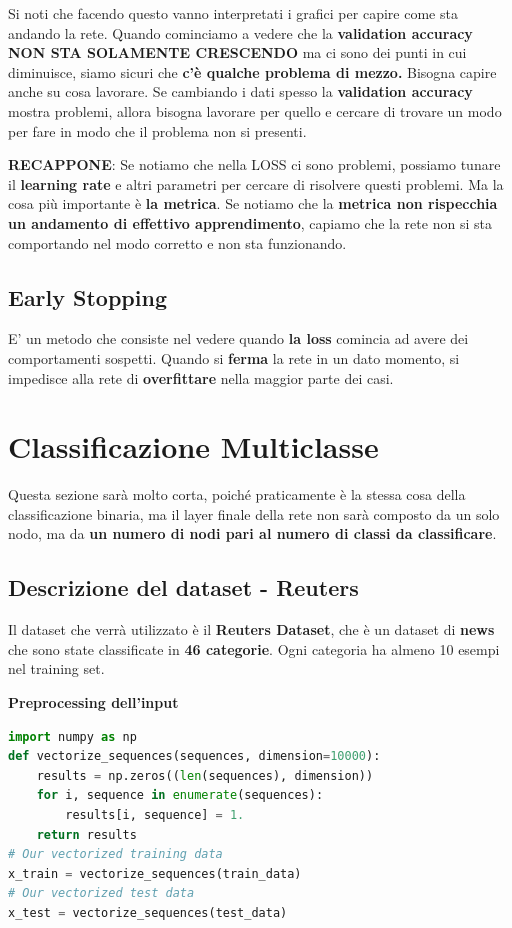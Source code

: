 Si noti che facendo questo vanno interpretati i grafici per capire come sta
andando la rete. Quando cominciamo a vedere che la \textbf{validation accuracy}
\textbf{NON STA SOLAMENTE CRESCENDO} ma ci sono dei punti in cui diminuisce,
siamo sicuri che \textbf{c'è qualche problema di mezzo.} Bisogna capire anche
su cosa lavorare. Se cambiando i dati spesso la \textbf{validation accuracy}
mostra problemi, allora bisogna lavorare per quello e cercare di trovare un
modo per fare in modo che il problema non si presenti.

\textbf{RECAPPONE}: Se notiamo che nella LOSS ci sono problemi, possiamo tunare il \textbf{learning rate} e altri
parametri per cercare di risolvere questi problemi. Ma la cosa più importante è \textbf{la metrica}. Se notiamo che
la \textbf{metrica non rispecchia un andamento di effettivo apprendimento}, capiamo che la rete non si sta comportando nel modo corretto
e non sta funzionando.

\subsection{Early Stopping}

E' un metodo che consiste nel vedere quando \textbf{la loss} comincia ad avere
dei comportamenti sospetti. Quando si \textbf{ferma} la rete in un dato
momento, si impedisce alla rete di \textbf{overfittare} nella maggior parte dei
casi.

\section{Classificazione Multiclasse}

Questa sezione sarà molto corta, poiché praticamente è la stessa cosa della
classificazione binaria, ma il layer finale della rete non sarà composto da un
solo nodo, ma da \textbf{un numero di nodi pari al numero di classi da
    classificare}.

\subsection{Descrizione del dataset - Reuters}

Il dataset che verrà utilizzato è il \textbf{Reuters Dataset}, che è un dataset
di \textbf{news} che sono state classificate in \textbf{46 categorie}. Ogni
categoria ha almeno 10 esempi nel training set.

\textbf{Preprocessing dell'input}

\begin{lstlisting}[language=Python]
import numpy as np
def vectorize_sequences(sequences, dimension=10000):
    results = np.zeros((len(sequences), dimension))
    for i, sequence in enumerate(sequences):
        results[i, sequence] = 1.
    return results
# Our vectorized training data
x_train = vectorize_sequences(train_data)
# Our vectorized test data
x_test = vectorize_sequences(test_data)
\end{lstlisting}

